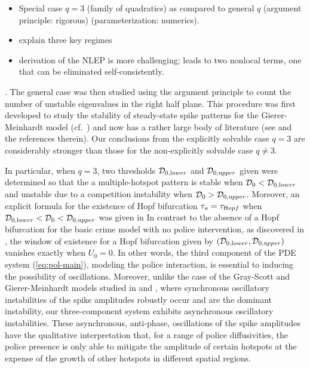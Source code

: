 \documentclass{article}%
\begin{document}
\begin{itemize}
  \item Special case $q=3$ (family of quadratics) as compared to general $q$
   (argument principle: rigorous) (parameterization: numerics).
  \item explain three key regimes
  \item derivation of the NLEP is more challenging; leads to two nonlocal
       terms, one that can be eliminated self-consistently.
\end{itemize}


\cite{kww_crime,mtw_enlep,nec}.  The general case was then studied
using the argument principle to count the number of unstable
eigenvalues in the right half plane.  This procedure was first
developed to study the stability of steady-state spike patterns for
the Gierer-Meinhardt model (cf.~\cite{mjww_1}) and now has a rather
large body of literature (see \cite{kww_crime} and the references
therein). Our conclusions from the explicitly solvable case $q=3$ are
considerably stronger than those for the non-explicitly solvable case
$q\neq3$. 

In particular, when $q=3$, two thresholds ${\mathcal
  D}_{0,{\textrm lower}}$ and ${\mathcal D}_{0,{\textrm upper}}$ given
 were determined so that
the a multiple-hotspot pattern is stable when ${\mathcal
  D}_{0}<{\mathcal D}_{0,{\textrm lower}}$ and unstable due to a
competition instability when ${\mathcal D}_{0}>{\mathcal
  D}_{0,{\textrm upper}}$. Moreover, an explicit formula for the
existence of Hopf bifurcation $\tau_{u}=\tau_{{\textrm Hopf}}$ when
${\mathcal D}_{0,{\textrm lower}}<{\mathcal D}_{0}<{\mathcal
  D}_{0,{\textrm upper}}$ was given in
In contrast to the absence of a
Hopf bifurcation for the basic crime model with no police
intervention, as discovered in \cite{kww_crime}, the window of
existence for a Hopf bifurcation given by $({\mathcal D}_{0,{\textrm
    lower}},{\mathcal D}_{0,{\textrm upper}})$ vanishes exactly when
$U_{0}=0$. In other words, the third component of the PDE system
(\ref{eq:pol-main}),
modeling the police interaction, is essential to inducing the
possibility of oscillations. Moreover, unlike the case of the
Gray-Scott and Gierer-Meinhardt models studied in \cite{kww_gs} and
\cite{mjww_1}, where synchronous oscillatory instabilities of the
spike amplitudes robustly occur and are the dominant instability, our
three-component system exhibits asynchronous oscillatory
instabilities. These asynchronous, anti-phase, oscillations of the
spike amplitudes have the qualitative interpretation that, for a range
of police diffusivities, the police presence is only able to mitigate
the amplitude of certain hotspots at the expense of the growth of
other hotspots in different spatial regions.
\end{document}
